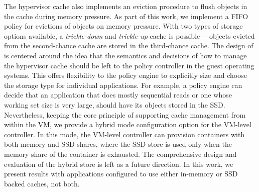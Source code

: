 The hypervisor cache also implements an eviction procedure
to flush objects in the cache during memory pressure.
%
As part of this work, we implement a FIFO policy for
evictions of objects on memory pressure. 
%
With two types of storage options available,
a \emph{trickle-down} and \emph{trickle-up} cache is possible---
objects evicted from the second-chance cache are stored
in the third-chance cache.
%
The design of \dd{} is centered around the idea that the
semantics and decisions of how to manage the hypervisor cache
should be left to the policy controller in the guest
operating systems.
%
This offers flexibility to the policy engine to explicitly 
size and choose the storage type for individual applications.
%
For example, a policy engine can decide that an application
that does mostly sequential reads or one whose working set
size is very large, should have its objects stored in 
the SSD.
%
%
Nevertheless, keeping the core principle of supporting cache management from 
within the VM, we provide a hybrid mode configuration option for the
VM-level controller.
%
In this mode, the VM-level controller can provision containers 
with both memory and SSD shares, where the SSD store is used only when the
memory share of the container is exhausted. 
%
The comprehensive design and evaluation of the hybrid store
is left as a future direction. 
%
In this work, we present
results with applications configured to use either in-memory
or SSD backed caches, not both.
%
%
%
%
